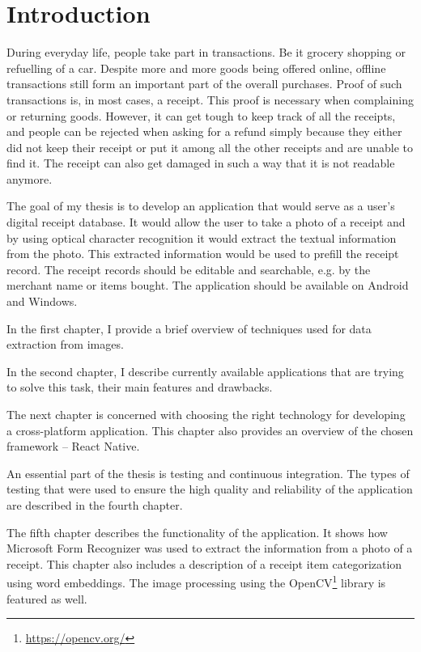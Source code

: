 \documentclass[
  digital, %
  table,   %
  oneside, %
  lof,     %
  lot,     %
]{fithesis3}
\begin{document}
\chapter*{Introduction}
During everyday life, people take part in transactions. Be it grocery shopping or refuelling of a car. Despite more and more goods being offered online, offline transactions still form an important part of the overall purchases. Proof of such transactions is, in most cases, a receipt. This proof is necessary when complaining or returning goods. However, it can get tough to keep track of all the receipts, and people can be rejected when asking for a refund simply because they either did not keep their receipt or put it among all the other receipts and are unable to find it. The receipt can also get damaged in such a way that it is not readable anymore. 

The goal of my thesis is to develop an application that would serve as a user's digital receipt database. It would allow the user to take a photo of a receipt and by using optical character recognition it would extract the textual information from the photo. This extracted information would be used to prefill the receipt record. The receipt records should be editable and searchable, e.g. by the merchant name or items bought. The application should be available on Android and Windows.

In the first chapter, I provide a brief overview of techniques used for data extraction from images.

In the second chapter, I describe currently available applications that are trying to solve this task, their main features and drawbacks.

The next chapter is concerned with choosing the right technology for developing a cross-platform application. This chapter also provides an overview of the chosen framework – React Native.

An essential part of the thesis is testing and continuous integration. The types of testing that were used to ensure the high quality and reliability of the application are described in the fourth chapter.

The fifth chapter describes the functionality of the application. It shows how Microsoft Form Recognizer \cite{WhatIsFormRecognizer} was used to extract the information from a photo of a receipt. This chapter also includes a description of a receipt item categorization using word embeddings. The image processing using the OpenCV\footnote{\url{https://opencv.org/}} library is featured as well.
\end{document}
